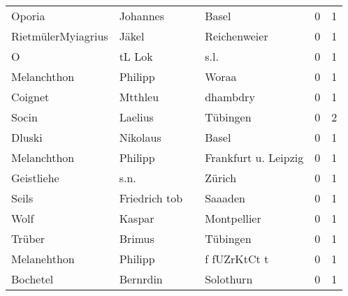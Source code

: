 \begin{center}
\begin{tiny}
\begin{longtabu}{llllrr}
                   Oporia &                           Johannes &             &                                       Basel &          0 &         1 \\
       RietmülerMyiagrius &                              Jäkel &             &                                Reichenweier &          0 &         1 \\
                        O &                             tL Lok &             &                                        s.l. &          0 &         1 \\
              Melanchthon &                            Philipp &             &                                       Woraa &          0 &         1 \\
                  Coignet &                            Mtthleu &             &                                    dhambdry &          0 &         1 \\
                    Socin &                            Laelius &             &                                    Tübingen &          0 &         2 \\
                   Dluski &                           Nikolaus &             &                                       Basel &          0 &         1 \\
              Melanchthon &                            Philipp &             &                        Frankfurt u. Leipzig &          0 &         1 \\
               Geistliehe &                               s.n. &             &                                      Zürich &          0 &         1 \\
                    Seils &                      Friedrich tob &             &                                     Saaaden &          0 &         1 \\
                     Wolf &                             Kaspar &             &                                 Montpellier &          0 &         1 \\
                   Trüber &                             Brimus &             &                                    Tübingen &          0 &         1 \\
              Melanehthon &                            Philipp &             &                                f fUZrKtCt t &          0 &         1 \\
                 Bochetel &                           Bernrdin &             &                                   Solothurn &          0 &         1 \\

\end{longtabu}
\end{tiny}
\end{center}
